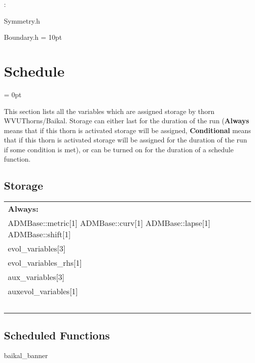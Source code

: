 \vspace{5mm}

: 

Symmetry.h

Boundary.h
\vspace{2mm}\parskip = 10pt 

\section{Schedule} 


\parskip = 0pt


\noindent This section lists all the variables which are assigned storage by thorn WVUThorns/Baikal.  Storage can either last for the duration of the run ({\bf Always} means that if this thorn is activated storage will be assigned, {\bf Conditional} means that if this thorn is activated storage will be assigned for the duration of the run if some condition is met), or can be turned on for the duration of a schedule function.


\subsection*{Storage}

\hspace{5mm}

 \begin{tabular*}{160mm}{ll} 

{\bf Always:}&  ~ \\ 
 ADMBase::metric[1] ADMBase::curv[1] ADMBase::lapse[1] ADMBase::shift[1] & ~\\ 
 evol\_variables[3] & ~\\ 
 evol\_variables\_rhs[1] & ~\\ 
 aux\_variables[3] & ~\\ 
 auxevol\_variables[1] & ~\\ 
~ & ~\\ 
\end{tabular*} 


\subsection*{Scheduled Functions}
\vspace{5mm}


\hspace{5mm} baikal\_banner 

\hspace{5mm}{\it output ascii art banner } 


